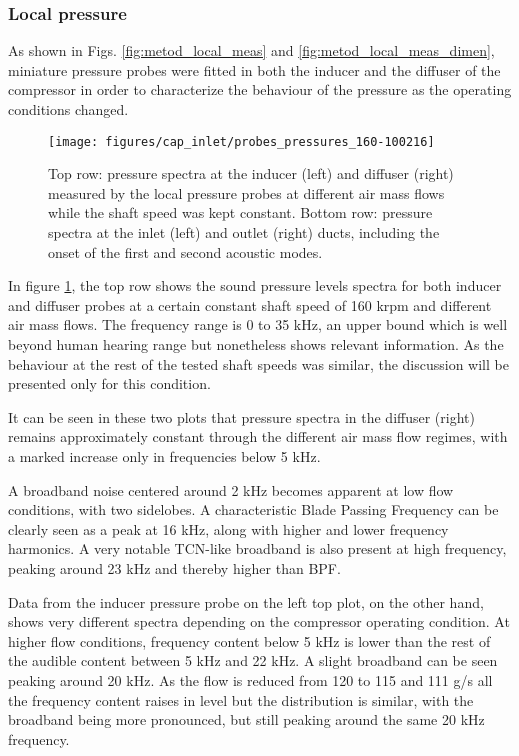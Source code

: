 \subsubsection{Local pressure}

As shown in Figs. \ref{fig:metod_local_meas} and \ref{fig:metod_local_meas_dimen}, miniature pressure probes were fitted in both the inducer and the diffuser of the compressor in order to characterize the behaviour of the pressure as the operating conditions changed.

\begin{figure}[thb!]
\hspace{-0.07\textwidth}
\texttt{[image: figures/cap\_inlet/probes\_pressures\_160-100216]}
\caption[Pressure spectra from probes and duct sensors]{Top row: pressure spectra at the inducer (left) and diffuser (right) measured by the local pressure probes at different air mass flows while the shaft speed was kept constant. Bottom row: pressure spectra at the inlet (left) and outlet (right) ducts, including the onset of the first and second acoustic modes.}
\label{fig:probes_all}
\end{figure}

In figure \ref{fig:probes_all}, the top row shows the sound pressure levels spectra for both inducer and diffuser probes at a certain constant shaft speed of 160 krpm and different air mass flows. The frequency range is 0 to 35 kHz, an upper bound which is well beyond human hearing range but nonetheless shows relevant information. As the behaviour at the rest of the tested shaft speeds was similar, the discussion will be presented only for this condition.

It can be seen in these two plots that pressure spectra in the diffuser (right) remains approximately constant through the different air mass flow regimes, with a marked increase only in frequencies below 5 kHz.

A broadband noise centered around 2 kHz becomes apparent at low flow conditions, with two sidelobes. A characteristic Blade Passing Frequency can be clearly seen as a peak at 16 kHz, along with higher and lower frequency harmonics. A very notable TCN-like broadband is also present at high frequency, peaking around 23 kHz and thereby higher than BPF. 

Data from the inducer pressure probe on the left top plot, on the other hand, shows very different spectra depending on the compressor operating condition. At higher flow conditions, frequency content below 5 kHz is lower than the rest of the audible content between 5 kHz and 22 kHz. A slight broadband can be seen peaking around 20 kHz. As the flow is reduced from 120 to 115 and 111 g/s all the frequency content raises in level but the distribution is similar, with the broadband being more pronounced, but still peaking around the same 20 kHz frequency.

